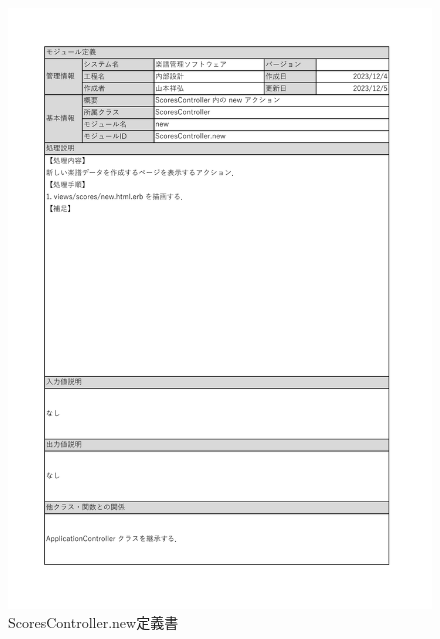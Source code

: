 \begin{figure}
    \centering
    \includegraphics[scale=0.7]{img/Scores/xlsx/ScoresController_new.pdf}
    \vspace{-1cm}
    \caption{ScoresController.new定義書}
\end{figure}
